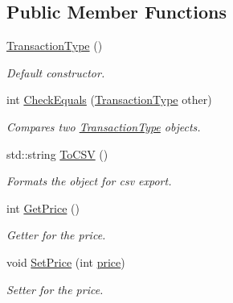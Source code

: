 \subsection*{Public Member Functions}
\begin{DoxyCompactItemize}
\item 
\mbox{\label{class_transaction_type_af74ebcedbda4d46f90de333b9268b8a8}} 
\mbox{\hyperlink{class_transaction_type_af74ebcedbda4d46f90de333b9268b8a8}{Transaction\+Type}} ()
\begin{DoxyCompactList}\small\item\em Default constructor. \end{DoxyCompactList}\item 
\mbox{\label{class_transaction_type_a0600069544b2650a1cbd3b4f99d80c8a}} 
int \mbox{\hyperlink{class_transaction_type_a0600069544b2650a1cbd3b4f99d80c8a}{Check\+Equals}} (\mbox{\hyperlink{class_transaction_type}{Transaction\+Type}} other)
\begin{DoxyCompactList}\small\item\em Compares two \mbox{\hyperlink{class_transaction_type}{Transaction\+Type}} objects. \end{DoxyCompactList}\item 
std\+::string \mbox{\hyperlink{class_transaction_type_ae93afca932014b0dfa4d1a3a66ca0ad2}{To\+C\+SV}} ()
\begin{DoxyCompactList}\small\item\em Formats the object for csv export. \end{DoxyCompactList}\item 
\mbox{\label{class_transaction_type_ac139f76c5ae460bd9c1c87570c6bee34}} 
int \mbox{\hyperlink{class_transaction_type_ac139f76c5ae460bd9c1c87570c6bee34}{Get\+Price}} ()
\begin{DoxyCompactList}\small\item\em Getter for the price. \end{DoxyCompactList}\item 
\mbox{\label{class_transaction_type_aecf32eadd4975d6284bcc031c8624daf}} 
void \mbox{\hyperlink{class_transaction_type_aecf32eadd4975d6284bcc031c8624daf}{Set\+Price}} (int \mbox{\hyperlink{class_transaction_type_a079b40eebde548904529841f8746d4ff}{price}})
\begin{DoxyCompactList}\small\item\em Setter for the price. \end{DoxyCompactList}\item 

\end{DoxyCompactItemize}
